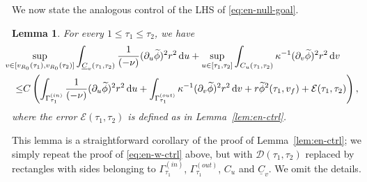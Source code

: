 \documentclass[10pt, reqno]{amsart}
\newtheorem{lemma}[theorem]{Lemma}
\theoremstyle{definition}
\theoremstyle{remark}
\theoremstyle{conjecture}
\numberwithin{equation}{section}
\newcommand{\ud}{\mathrm{d}}
\newcommand{\rd}{\partial}
\newcommand{\0}{\emptyset}
\newcommand{\Gmm}{\Gamma}
\newcommand{\kpp}{\kappa}
\newcommand{\calD}{\mathcal D}
\newcommand{\calE}{\mathcal E}
\newcommand{\uC}{\underline{C}}
\newcommand{\dur}{\nu}
\newcommand{\phibg}{\overline{\phi}}				%
\newcommand{\phidf}{\widetilde{\phi}}				%
\begin{document}
We now state the analogous control of the LHS of \eqref{eq:en-null-goal}.
\begin{lemma} \label{lem:en-null-ctrl}
For every $1 \leq \tau_{1} \leq \tau_{2}$, we have
\begin{equation} \label{eq:en-null-ctrl}
\begin{aligned}
& \hskip-2em
	\sup_{v \in [v_{R_{0}}(\tau_{1}), v_{R_0}(\tau_{2})] }\int_{\uC_{v}(\tau_{1}, \tau_{2})} \frac{1}{(-\dur)} (\rd_{u} \phidf)^{2} r^{2} \, \ud u
	+ \sup_{u \in [\tau_{1}, \tau_{2}] }\int_{C_{u}(\tau_{1}, \tau_{2})} \kpp^{-1} (\rd_{v} \phidf)^{2} r^{2} \, \ud v  \\
	\leq & C \left( \int_{\Gmm^{(in)}_{\tau_{1}}} \frac{1}{(-\dur)} (\rd_{u} \phidf)^{2} r^{2} \, \ud u
	+ \int_{\Gmm^{(out)}_{\tau_{1}}} \kpp^{-1} (\rd_{v} \phidf)^{2} r^{2} \, \ud v + r \phidf^{2} (\tau_{1}, v_{f}) + \calE(\tau_{1}, \tau_{2}) \right),
\end{aligned}
\end{equation}
where the error $\calE(\tau_{1}, \tau_{2})$ is defined as in Lemma~\ref{lem:en-ctrl}.
\end{lemma}
This lemma is a straightforward corollary of the proof of Lemma~\ref{lem:en-ctrl}; we simply repeat the proof of \eqref{eq:en-w-ctrl} above, but with $\calD(\tau_{1}, \tau_{2})$ replaced by rectangles with sides belonging to $\Gmm^{(in)}_{\tau_{1}}$, $\Gmm^{(out)}_{\tau_{1}}$, $C_{u}$ and $\uC_{v}$. We omit the details.
\end{document}
